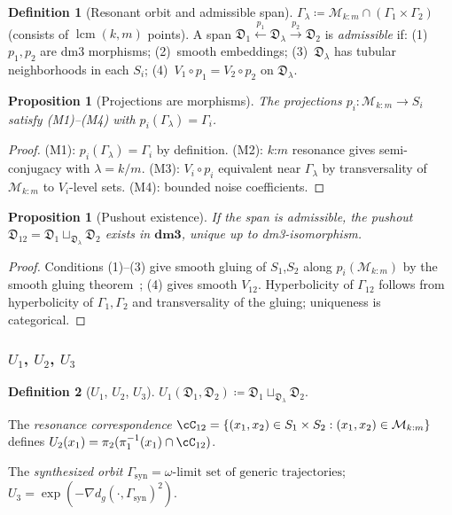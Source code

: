 \documentclass[12pt, oneside]{book}
\theoremstyle{plain}
\newtheorem{proposition}[theorem]{Proposition}
\theoremstyle{definition}
\newtheorem{definition}{Definition}[section]
\theoremstyle{remark}
\newcommand{\dm}{\mathfrak{D}}
\newcommand{\dmcat}{\mathbf{dm3}}
\newcommand{\Orb}{\Gamma}
\newcommand{\cM}{\mathcal{M}}
\newcommand{\dg}{d_g}
\DeclareMathOperator{\lcm}{lcm}
\begin{document}
\begin{definition}[Resonant orbit and admissible span]\label{def:span}
$\Orb_\lambda\coloneqq\cM_{k:m}\cap(\Orb_1\times\Orb_2)$
(consists of $\lcm(k,m)$ points). A span
$\dm_1\xleftarrow{p_1}\dm_\lambda\xrightarrow{p_2}\dm_2$
is \emph{admissible} if: (1)~$p_1,p_2$ are dm3 morphisms;
(2)~smooth embeddings; (3)~$\dm_\lambda$ has tubular neighborhoods
in each $S_i$; (4)~$V_1\circ p_1=V_2\circ p_2$ on $\dm_\lambda$.
\end{definition}

\begin{proposition}[Projections are morphisms]\label{prop:proj}
The projections $p_i\colon\cM_{k:m}\to S_i$ satisfy (M1)--(M4)
with $p_i(\Orb_\lambda)=\Orb_i$.
\end{proposition}
\begin{proof}
(M1): $p_i(\Orb_\lambda)=\Orb_i$ by definition.
(M2): $k$:$m$ resonance gives semi-conjugacy with $\lambda=k/m$.
(M3): $V_i\circ p_i$ equivalent near $\Orb_\lambda$ by transversality
of $\cM_{k:m}$ to $V_i$-level sets.
(M4): bounded noise coefficients.
\end{proof}

\begin{proposition}[Pushout existence]\label{prop:pushout}
If the span is admissible, the pushout
$\dm_{12}=\dm_1\sqcup_{\dm_\lambda}\dm_2$ exists in $\dmcat$,
unique up to dm3-isomorphism.
\end{proposition}
\begin{proof}
Conditions (1)--(3) give smooth gluing of $S_1$,$S_2$ along
$p_i(\cM_{k:m})$ by the smooth gluing theorem~\cite{Lee};
(4) gives smooth $V_{12}$. Hyperbolicity of $\Orb_{12}$ follows
from hyperbolicity of $\Orb_1,\Orb_2$ and transversality of the
gluing; uniqueness is categorical.
\end{proof}

\subsubsection{\texorpdfstring{$U_1$, $U_2$, $U_3$}{U1, U2, U3}}

\begin{definition}[$U_1$, $U_2$, $U_3$]\label{def:U}
$U_1(\dm_1,\dm_2)\coloneqq\dm_1\sqcup_{\dm_\lambda}\dm_2$.

The \emph{resonance correspondence}
$\cC_{12}=\{(x_1,x_2)\in S_1\times S_2:(x_1,x_2)\in\cM_{k:m}\}$
defines $U_2(x_1)=\pi_2(\pi_1^{-1}(x_1)\cap\cC_{12})$.

The \emph{synthesized orbit}
$\Orb_{\mathrm{syn}}=\omega\text{-limit set of generic trajectories}$;
$U_3=\exp(-\nabla\dg(\cdot,\Orb_{\mathrm{syn}})^2)$.
\end{definition}
\end{document}
